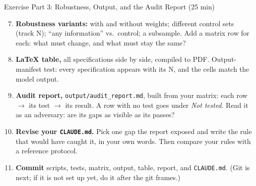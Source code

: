 \documentclass[aspectratio=169, 11pt]{beamer}
\begin{document}
\begin{frame}{Exercise Part 3: Robustness, Output, and the Audit Report (25 min)}
  \small
  \begin{enumerate}
    \setcounter{enumi}{6}
    \item \textbf{Robustness variants:} with and without weights; different control sets (track N); ``any information'' vs.\ control; a subsample. \alert{Add a matrix row for each:} what must change, and what must stay the same?

    \vspace{0.2em}
    \item \textbf{\LaTeX{} table,} all specifications side by side, compiled to PDF. Output-manifest test: every specification appears with its N, and the cells match the model output.

    \vspace{0.2em}
    \item \textbf{Audit report,} \texttt{output/audit\_report.md}, built from your matrix: each row $\rightarrow$ its test $\rightarrow$ its result. A row with no test goes under \textit{Not tested}. Read it as an adversary: are its gaps as visible as its passes?

    \vspace{0.2em}
    \item \textbf{Revise your \texttt{CLAUDE.md}.} Pick one gap the report exposed and write the rule that would have caught it, in your own words. Then compare your rules with a reference protocol. \hfill \hyperlink{refprotocol}{}

    \vspace{0.2em}
    \item \textbf{Commit} scripts, tests, matrix, output, table, report, and \texttt{CLAUDE.md}. (Git is next; if it is not set up yet, do it after the git frames.)
  \end{enumerate}
\end{frame}
\end{document}
